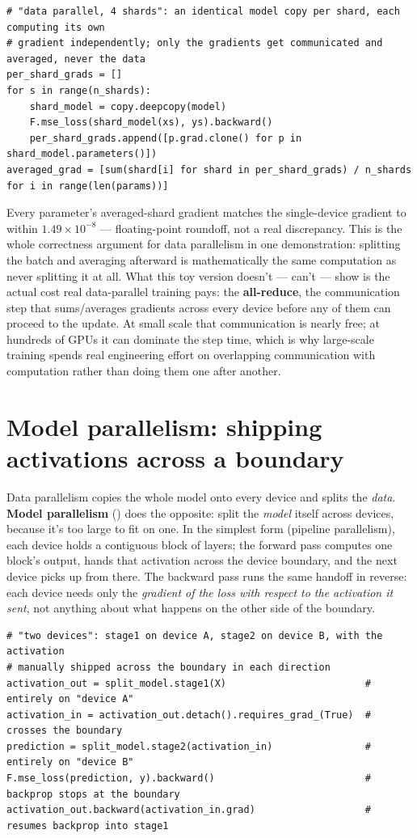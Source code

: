 \begin{lstlisting}
# "data parallel, 4 shards": an identical model copy per shard, each computing its own
# gradient independently; only the gradients get communicated and averaged, never the data
per_shard_grads = []
for s in range(n_shards):
    shard_model = copy.deepcopy(model)
    F.mse_loss(shard_model(xs), ys).backward()
    per_shard_grads.append([p.grad.clone() for p in shard_model.parameters()])
averaged_grad = [sum(shard[i] for shard in per_shard_grads) / n_shards for i in range(len(params))]
\end{lstlisting}

Every parameter's averaged-shard gradient matches the single-device gradient to within $1.49\times10^{-8}$ --- floating-point roundoff, not a real discrepancy. This is the whole correctness argument for data parallelism in one demonstration: splitting the batch and averaging afterward is mathematically the same computation as never splitting it at all. What this toy version doesn't --- can't --- show is the actual cost real data-parallel training pays: the \textbf{all-reduce}, the communication step that sums/averages gradients across every device before any of them can proceed to the update. At small scale that communication is nearly free; at hundreds of GPUs it can dominate the step time, which is why large-scale training spends real engineering effort on overlapping communication with computation rather than doing them one after another.

\section{Model parallelism: shipping activations across a boundary}

Data parallelism copies the whole model onto every device and splits the \emph{data}. \textbf{Model parallelism} () does the opposite: split the \emph{model} itself across devices, because it's too large to fit on one. In the simplest form (pipeline parallelism), each device holds a contiguous block of layers; the forward pass computes one block's output, hands that activation across the device boundary, and the next device picks up from there. The backward pass runs the same handoff in reverse: each device needs only the \emph{gradient of the loss with respect to the activation it sent}, not anything about what happens on the other side of the boundary.

\begin{lstlisting}
# "two devices": stage1 on device A, stage2 on device B, with the activation
# manually shipped across the boundary in each direction
activation_out = split_model.stage1(X)                        # entirely on "device A"
activation_in = activation_out.detach().requires_grad_(True)  # crosses the boundary
prediction = split_model.stage2(activation_in)                # entirely on "device B"
F.mse_loss(prediction, y).backward()                          # backprop stops at the boundary
activation_out.backward(activation_in.grad)                   # resumes backprop into stage1
\end{lstlisting}


